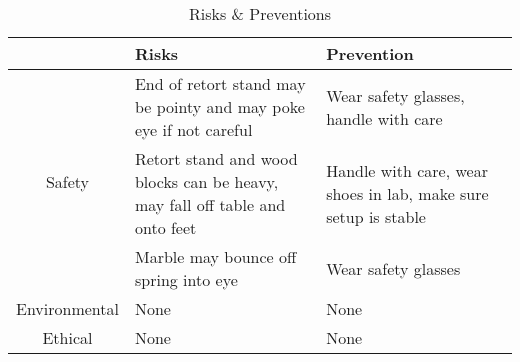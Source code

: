 \begin{table}
    \begin{center}
        \begin{tabular}{|c|p{5cm}|p{5cm}|} 
            \hline
            ~ & Risks & Prevention \\ 
            \hline
            \multirow{3}{4em}{Safety} & End of retort stand may be pointy and may poke eye if not careful & Wear safety glasses, handle with care \\ 
            \cline{2-3}
            & Retort stand and wood blocks can be heavy, may fall off table and onto feet & Handle with care, wear shoes in lab, make sure setup is stable \\
            \cline{2-3}
            & Marble may bounce off spring into eye & Wear safety glasses \\
            \hline
            Environmental & None & None \\
            \hline
            Ethical & None & None  \\ 
            \hline
        \end{tabular}
        \caption{Risks \& Preventions}
    \end{center}
\end{table}
\FloatBarrier